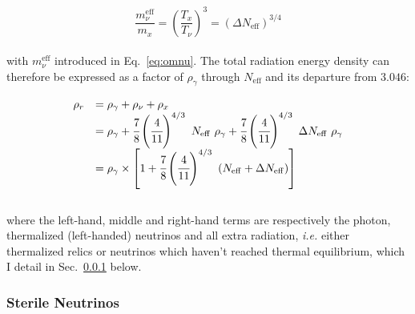 \begin{equation}
\label{eq:omx}
\frac{m_\nu^{\mathrm{eff}}}{m_x} = \left( \frac{T_x}{T_\nu} \right)^3 = \left( \Delta N_{\mathrm{eff}} \right)^{3/4}
\end{equation} \\ with $m_\nu^{\mathrm{eff}}$ introduced in Eq.~\ref{eq:omnu}. The total radiation energy density can therefore be expressed as a factor of $\rho_\gamma$ through $N_{\mathrm{eff}}$ and its departure from $3.046$:

\begin{equation}
\begin{array}{ll}
\rho_r & = \rho_\gamma + \rho_\nu + \rho_x \\
 & = \rho_\gamma + \cfrac{7}{8} \left( \cfrac{4}{11} \right)^{4/3}~N_{\mathrm{eff}}~\rho_\gamma + \cfrac{7}{8} \left( \cfrac{4}{11} \right)^{4/3}~\Delta N_{\mathrm{eff}}~\rho_\gamma \\
 & = \rho_\gamma \times \left[ 1 + \cfrac{7}{8}\left( \cfrac{4}{11} \right) ^{4/3} ~\left( N_{\mathrm{eff}} + \Delta N_{\mathrm{eff}} \right) \right]
\end{array}
\end{equation} \\ where the left-hand, middle and right-hand terms are respectively the photon, thermalized (left-handed) neutrinos and all extra radiation, \textit{i.e.} either thermalized relics or neutrinos which haven't reached thermal equilibrium, which I detail in Sec.~\ref{sec:rhneu} below.


\subsubsection{Sterile Neutrinos}
\label{sec:rhneu}

